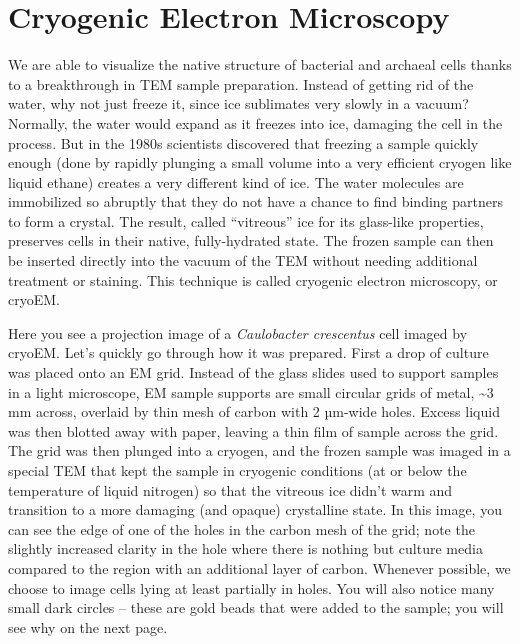 \documentclass[]{tufte-book}
\begin{document}
\hypertarget{cryogenic-electron-microscopy}{%
\section{Cryogenic Electron Microscopy}\label{cryogenic-electron-microscopy}}

We are able to visualize the native structure of bacterial and archaeal cells thanks to a breakthrough in TEM sample preparation. Instead of getting rid of the water, why not just freeze it, since ice sublimates very slowly in a vacuum? Normally, the water would expand as it freezes into ice, damaging the cell in the process. But in the 1980s scientists discovered that freezing a sample quickly enough (done by rapidly plunging a small volume into a very efficient cryogen like liquid ethane) creates a very different kind of ice. The water molecules are immobilized so abruptly that they do not have a chance to find binding partners to form a crystal. The result, called ``vitreous'' ice for its glass-like properties, preserves cells in their native, fully-hydrated state. The frozen sample can then be inserted directly into the vacuum of the TEM without needing additional treatment or staining. This technique is called cryogenic electron microscopy, or cryoEM.

Here you see a projection image of a \emph{Caulobacter crescentus} cell imaged by cryoEM. Let's quickly go through how it was prepared. First a drop of culture was placed onto an EM grid. Instead of the glass slides used to support samples in a light microscope, EM sample supports are small circular grids of metal, \textasciitilde{}3 mm across, overlaid by thin mesh of carbon with 2 µm-wide holes. Excess liquid was then blotted away with paper, leaving a thin film of sample across the grid. The grid was then plunged into a cryogen, and the frozen sample was imaged in a special TEM that kept the sample in cryogenic conditions (at or below the temperature of liquid nitrogen) so that the vitreous ice didn't warm and transition to a more damaging (and opaque) crystalline state. In this image, you can see the edge of one of the holes in the carbon mesh of the grid; note the slightly increased clarity in the hole where there is nothing but culture media compared to the region with an additional layer of carbon. Whenever possible, we choose to image cells lying at least partially in holes. You will also notice many small dark circles -- these are gold beads that were added to the sample; you will see why on the next page.
\end{document}
